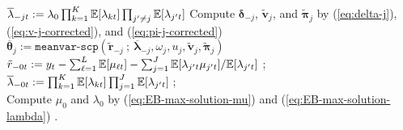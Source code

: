 \begin{algorithm}[!h]
{{      $\overline{\lambda}_{-jt} := \lambda_0\prod_{k=1}^K \mathbb{E}[\lambda_{kt}]\prod_{j' \neq j}\mathbb{E}[\lambda_{j't}] $ 
      Compute $\boldsymbol{\delta}_{-j}$, $\tilde{\mathbf{v}}_{j}$, and $\tilde{\boldsymbol{\boldsymbol{\pi}}}_{j}$ by (\ref{eq:delta-j}), (\ref{eq:v-j-corrected}), and (\ref{eq:pi-j-corrected})  
      $\overline{\boldsymbol{\theta}}_j := \texttt{meanvar-scp}(\tilde{\mathbf{r}}_{-j} \:;\:\overline{\boldsymbol{\lambda}}_{-j}, \omega_j, u_j, \tilde{\mathbf{v}}_{j}, \tilde{\boldsymbol{\boldsymbol{\pi}}}_j)$ 
    }
    $\tilde{r}_{-0t} := y_t - \sum_{\ell = 1}^L \mathbb{E}[\mu_{\ell t}] - \sum_{j=1}^J \mathbb{E}[\lambda_{j't} \mu_{j't}] / \mathbb{E}[\lambda_{j't}]\;$; \\
    $\overline{\lambda}_{-0t} := \prod_{k=1}^K \mathbb{E}[\lambda_{kt}]\prod_{j=1}^J\mathbb{E}[\lambda_{j't}]\;$; \\
    Compute $\mu_0$ and $\lambda_0$ by (\ref{eq:EB-max-solution-mu}) and (\ref{eq:EB-max-solution-lambda})  
  }
  .
\end{algorithm}
